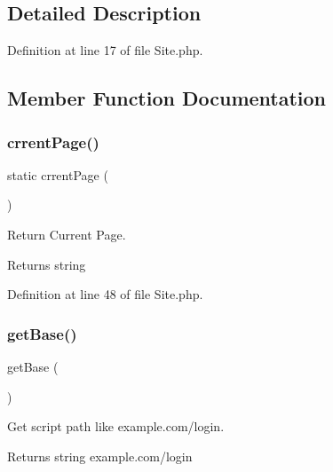 \subsection{Detailed Description}


Definition at line 17 of file Site.\+php.



\subsection{Member Function Documentation}
\mbox{\label{class_zest_1_1_site_1_1_site_a402779c51eaf3f201998b92eef6ea24b}} 
\subsubsection{\texorpdfstring{crrent\+Page()}{crrentPage()}}
{\footnotesize\ttfamily static crrent\+Page (\begin{DoxyParamCaption}{ }\end{DoxyParamCaption})\hspace{0.3cm}{\ttfamily [static]}}

Return Current Page.

\begin{DoxyReturn}{Returns}
string 
\end{DoxyReturn}


Definition at line 48 of file Site.\+php.

\mbox{\label{class_zest_1_1_site_1_1_site_aeab69f6d8e0e9bae67e8289ca500d917}} 
\subsubsection{\texorpdfstring{get\+Base()}{getBase()}}
{\footnotesize\ttfamily get\+Base (\begin{DoxyParamCaption}{ }\end{DoxyParamCaption})}

Get script path like example.\+com/login.

\begin{DoxyReturn}{Returns}
string example.\+com/login 
\end{DoxyReturn}


